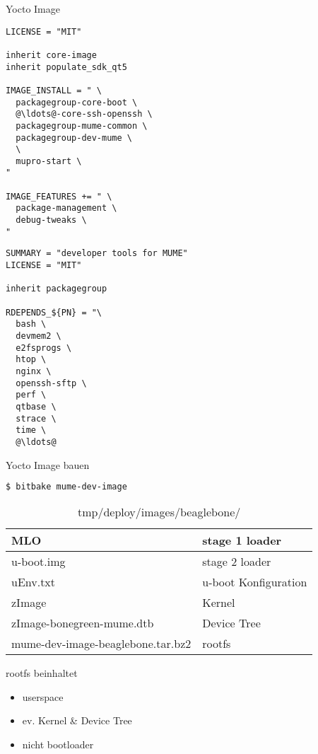 
\begin{frame}[fragile]{Yocto Image}
	\begin{multicols}{2}
		\begin{lstlisting}[title=mume-dev-image.bb,frame=single,language=bitbake]
LICENSE = "MIT"

inherit core-image
inherit populate_sdk_qt5

IMAGE_INSTALL = " \
  packagegroup-core-boot \
  @\ldots@-core-ssh-openssh \
  packagegroup-mume-common \
  packagegroup-dev-mume \
  \
  mupro-start \
"

IMAGE_FEATURES += " \
  package-management \
  debug-tweaks \
"
		\end{lstlisting}
		\begin{lstlisting}[title=packagegroup-dev-mume.bb, frame=single, numbers=right, language=bitbake]
SUMMARY = "developer tools for MUME"
LICENSE = "MIT"

inherit packagegroup

RDEPENDS_${PN} = "\
  bash \
  devmem2 \
  e2fsprogs \
  htop \
  nginx \
  openssh-sftp \
  perf \
  qtbase \
  strace \
  time \
  @\ldots@
		\end{lstlisting}
	\end{multicols}
\end{frame}

\begin{frame}[fragile]{Yocto Image bauen}
	\begin{lstlisting}[frame=single,language=bash]
$ bitbake mume-dev-image
	\end{lstlisting}
	\begin{table}
		\caption{tmp/deploy/images/beaglebone/}
		\begin{tabular}{ll}
			\hline MLO & stage 1 loader \\ 
			\hline u-boot.img & stage 2 loader \\ 
			\hline uEnv.txt & u-boot Konfiguration \\ 
			\hline zImage & Kernel \\ 
			\hline zImage-bonegreen-mume.dtb & Device Tree \\ 
			\hline mume-dev-image-beaglebone.tar.bz2 & rootfs \\ 
			\hline 
		\end{tabular} 
	\end{table}
\end{frame}

\begin{frame}{rootfs}
	beinhaltet
	\begin{itemize}
		\item userspace
		\item ev. Kernel \& Device Tree
		\item nicht bootloader
	\end{itemize}
\end{frame}

